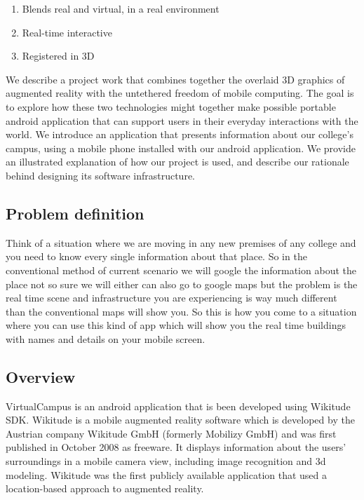 \documentclass{article}
\begin{document}
\begin{enumerate}
\item  Blends real and virtual, in a real environment 
\item  Real-time interactive 
\item  Registered in 3D 
\end{enumerate}

\par We describe a project work that combines together the overlaid 3D graphics of augmented reality with the untethered freedom of mobile computing. The goal is to explore how these two technologies might together make possible portable android application that can support users in their everyday interactions with the world. We introduce an application that presents information about our college’s campus, using a mobile phone installed with our android application. We provide an illustrated explanation of how our project is used, and describe our rationale behind designing its software infrastructure. \\


\subsection{Problem definition}
\par Think of a situation where we are moving in any new premises of any college and you need to know every single information about that place. So in the conventional method of current scenario we will google the information about the place not so sure we will either can also go to google maps but the problem is the real time scene and infrastructure you are experiencing is way much different than the conventional maps will show you. So this is how you come to a situation where you can use this kind of app which will show you the real time buildings with names and details on your mobile screen.

\subsection{Overview }
\par VirtualCampus is an android application that is been developed using Wikitude SDK. Wikitude is a mobile augmented reality software which is developed by the Austrian company Wikitude GmbH (formerly Mobilizy GmbH) and was first published in October 2008 as freeware. It displays information about the users' surroundings in a mobile camera view, including image recognition and 3d modeling. Wikitude was the first publicly available application that used a location-based approach to augmented reality. 
\end{document}
